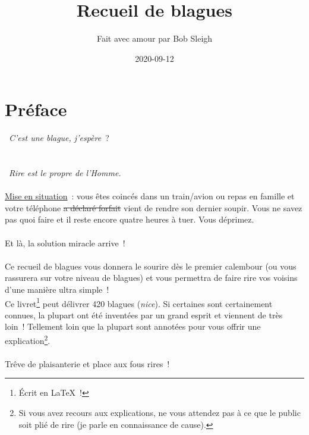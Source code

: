 \documentclass[10pt,a5paper,fullpage]{book}
\author{Fait avec amour par Bob Sleigh}
\title{Recueil de blagues}
\date{2020-09-12}
\begin{document}
	\maketitle
	\tableofcontents
	\newpage
	\section*{Préface}
	\guillemotleft~\textit{C'est une blague, j'espère}~?~\guillemotright\\~ \\ \\
	\guillemotleft~\textit{Rire est le propre de l'Homme.}~\guillemotright\\~ \\
	
	\underline{Mise en situation}~: vous êtes coincés dans un train/avion ou repas en famille et votre téléphone \sout{a déclaré forfait} vient de rendre son dernier soupir. Vous ne savez pas quoi faire et il reste encore quatre heures à tuer. Vous déprimez. \\ \\
	Et là, la solution miracle arrive~! \\ \\
	Ce recueil de blagues vous donnera le sourire dès le premier calembour (ou vous rassurera sur votre niveau de blagues) et vous permettra de faire rire vos voisins d'une manière ultra simple~! \\Ce livret\footnote{Écrit en \LaTeX~!} peut délivrer 420 blagues (\textit{nice}). %
	Si certaines sont certainement connues, la plupart ont été inventées par un grand esprit et viennent de très loin~! Tellement loin que la plupart sont annotées pour vous offrir une explication\footnote{Si vous avez recours aux explications, ne vous attendez pas à ce que le public soit plié de rire (je parle en connaissance de cause).}. \\ \\
	Trêve de plaisanterie et place aux fous rires~!
	
\end{document}
